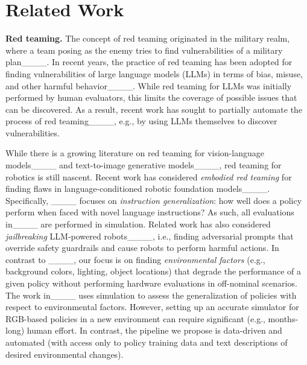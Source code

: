 \section{Related Work}
\label{sec:related work} 


{\bf Red teaming.} The concept of red teaming originated in the military realm, where a team posing as the enemy tries to find vulnerabilities of a military plan____. In recent years, the practice of red teaming has been adopted for finding vulnerabilities of large language models (LLMs) in terms of bias, misuse, and other harmful behavior____. While red teaming for LLMs was initially performed by human evaluators, this limits the coverage of possible issues that can be discovered. As a result, recent work has sought to partially automate the process of red teaming____, e.g., by using LLMs themselves to discover vulnerabilities. 

While there is a growing literature on red teaming for vision-language models____ and text-to-image generative models____, red teaming for robotics is still nascent. Recent work has considered \emph{embodied red teaming} for finding flaws in language-conditioned robotic foundation models____. Specifically, ____ focuses on \emph{instruction generalization}: how well does a policy perform when faced with novel language instructions? As such, all evaluations in____ are performed in simulation. Related work has also considered \emph{jailbreaking} LLM-powered robots____, i.e., finding adversarial prompts that override safety guardrails and cause robots to perform harmful actions. In contrast to ____, our focus is on finding \emph{environmental factors} (e.g., background colors, lighting, object locations) that degrade the performance of a given policy without performing hardware evaluations in off-nominal scenarios. The work in____ uses simulation to assess the generalization of policies with respect to environmental factors. However, setting up an accurate simulator for RGB-based policies in a new environment can require significant (e.g., months-long) human effort. In contrast, the pipeline we propose is data-driven and automated (with access only to policy training data and text descriptions of desired environmental changes). 

